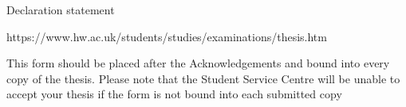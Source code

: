 Declaration statement

https://www.hw.ac.uk/students/studies/examinations/thesis.htm

This form should be placed after the Acknowledgements and bound into every copy of the thesis. Please note that the Student Service Centre will be unable to accept your thesis if the form is not bound into each submitted copy

